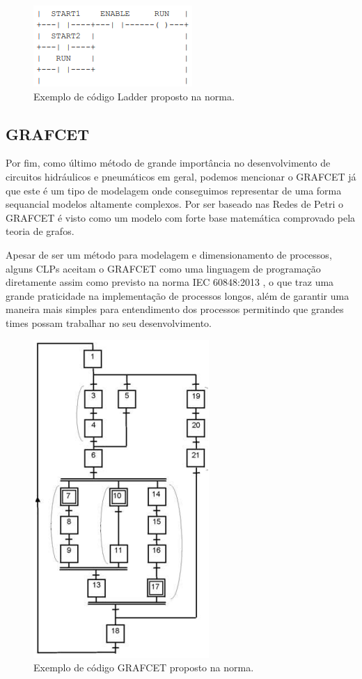 \begin{figure}[htb]
    \begin{center}
	    \includegraphics{figs/ladder-diag.png}
	\end{center}
	\caption{Exemplo de código Ladder proposto na norma.} 
\end{figure}

\subsection{GRAFCET}

Por fim, como último método de grande importância no desenvolvimento de circuitos hidráulicos e pneumáticos em geral, 
podemos mencionar o \ac{GRAFCET} já que este é um tipo de modelagem onde conseguimos representar de uma forma sequancial
modelos altamente complexos. Por ser baseado nas Redes de Petri o \ac{GRAFCET} é visto como um modelo com forte base
matemática comprovado pela teoria de grafos.

Apesar de ser um método para modelagem e dimensionamento de processos, alguns \ac{CLP}s aceitam o \ac{GRAFCET} como uma
linguagem de programação diretamente assim como previsto na norma IEC 60848:2013 \cite{IEC-60848:2013}, o que traz uma 
grande praticidade na implementação de processos longos, além de garantir uma maneira mais simples para entendimento dos 
processos permitindo que grandes times possam trabalhar no seu desenvolvimento.

\begin{figure}[htb]
    \begin{center}
	    \includegraphics[scale=0.5]{figs/grafcet-diag.png}
	\end{center}
	\caption{Exemplo de código GRAFCET proposto na norma.} 
\end{figure}

